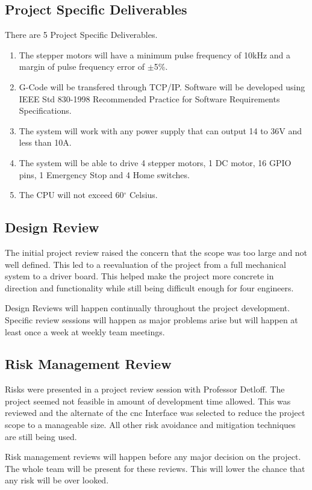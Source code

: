 \subsection{Project Specific Deliverables}
There are 5 Project Specific Deliverables.
	\begin{enumerate}
		\item  The stepper motors will have a minimum pulse frequency of 10kHz and a margin of pulse frequency error of  $\pm $5\%.
		\item G-Code will be transfered through TCP/IP.
Software will be developed using IEEE Std 830-1998 Recommended Practice for Software Requirements Specifications.
		\item The system will work with any power supply that can output 14 to 36V and less than 10A.
		\item The system will be able to drive 4 stepper motors, 1 DC motor, 16 GPIO pins, 1 Emergency Stop and 4 Home switches.
		\item The CPU will not exceed 60$^\circ$ Celsius. 
	\end{enumerate}
\subsection{Design Review}
The initial project review raised the concern that the scope was too large and not well defined.
This led to a reevaluation of the project from a full mechanical system to a driver board.
This helped make the project more concrete in direction and functionality while still being difficult enough for four engineers.

Design Reviews will happen continually throughout the project development. 
Specific review sessions will happen as major problems arise but will happen at least once a week at weekly team meetings.
\subsection{Risk Management Review}
Risks were presented in a project review session with Professor Detloff.
The project seemed not feasible in amount of development time allowed.
This was reviewed and the alternate of the \gls{cnc} Interface was selected to reduce the project scope to a manageable size. 
All other risk avoidance and mitigation techniques are still being used.   

Risk management reviews will happen before any major decision on the project.
The whole team will be present for these reviews. 
This will lower the chance that any risk will be over looked.
